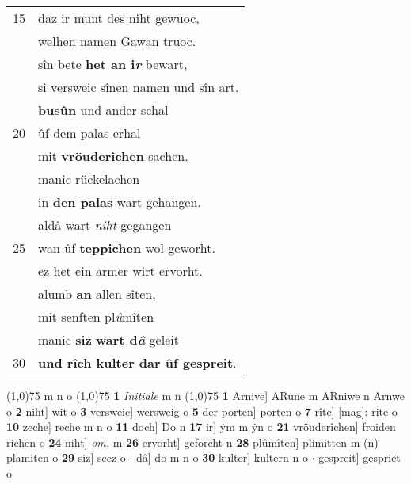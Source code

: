 \documentclass[8pt,a4paper,notitlepage]{article}
\begin{document}
\begin{table}[ht]
\begin{minipage}[t]{0.5\linewidth}
\begin{tabular}{rl}
15 & daz ir munt des niht gewuoc,\\ 
 & welhen namen Gawan truoc.\\ 
 & sîn bete \textbf{het an i\textit{r}} bewart,\\ 
 & si versweic sînen namen und sîn art.\\ 
 & \textbf{busûn} und ander schal\\ 
20 & ûf dem palas erhal\\ 
 & mit \textbf{vröuderîchen} sachen.\\ 
 & manic rückelachen\\ 
 & in \textbf{den palas} wart gehangen.\\ 
 & aldâ wart \textit{niht} gegangen\\ 
25 & wan ûf \textbf{teppichen} wol geworht.\\ 
 & ez het ein armer wirt ervorht.\\ 
 & alumb \textbf{an} allen sîten,\\ 
 & mit senften pl\textit{û}mîten\\ 
 & manic \textbf{siz} \textbf{wart d\textit{â}} geleit\\ 
30 & \textbf{und rîch kulter dar ûf gespreit}.\\ 
\end{tabular}
\scriptsize
\line(1,0){75} \newline
m n o \newline
\line(1,0){75} \newline
\textbf{1} \textit{Initiale} m n  \newline
\line(1,0){75} \newline
\textbf{1} Arnive] ARune m ARniwe n Arnwe o \textbf{2} niht] wit o \textbf{3} versweic] wersweig o \textbf{5} der porten] porten o \textbf{7} rîte] [mag]: rite o \textbf{10} zeche] reche m n o \textbf{11} doch] Do n \textbf{17} ir] ẏm m ẏn o \textbf{21} vröuderîchen] froiden richen o \textbf{24} niht] \textit{om.} m \textbf{26} ervorht] geforcht n \textbf{28} plûmîten] plimitten m (n) plamiten o \textbf{29} siz] secz o  $\cdot$ dâ] do m n o \textbf{30} kulter] kultern n o  $\cdot$ gespreit] gespriet o \newline
\end{minipage}
\end{table}
\newpage
\end{document}
